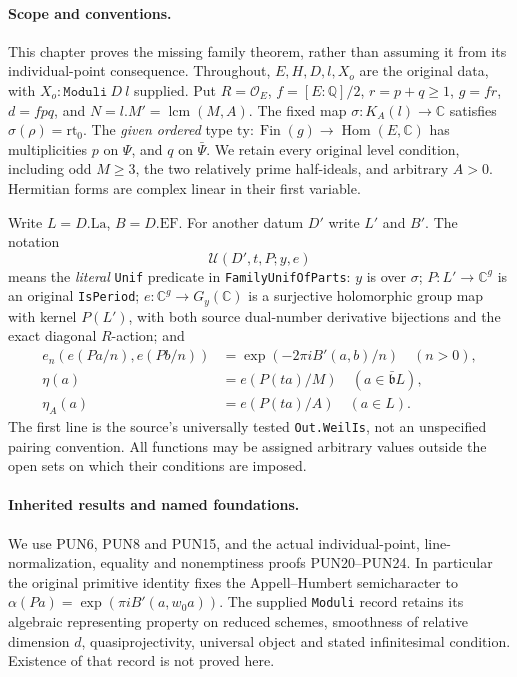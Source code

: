 \documentclass[11pt,a4paper]{article}
\numberwithin{equation}{section}
\theoremstyle{remark}\newtheorem{remark}[theorem]{Remark}
\begin{document}
\paragraph{Scope and conventions.}
This chapter proves the missing family theorem, rather than assuming it
from its individual-point consequence.  Throughout, \(E,H,D,l,X_o\)
are the original data, with \(X_o:\texttt{Moduli}\ D\ l\) supplied.
Put \(R=\mathcal O_E\), \(f=[E:\mathbb Q]/2\), \(r=p+q\geq1\),
\(g=fr\), \(d=fpq\), and \(N=l.M'=\operatorname{lcm}(M,A)\).
The fixed map \(\sigma:K_A(l)\to\mathbb C\) satisfies
\(\sigma(\rho)=\mathrm{rt}_0\).  The \emph{given ordered} type
\(\mathrm{ty}:\operatorname{Fin}(g)\to\operatorname{Hom}(E,\mathbb C)\)
has multiplicities \(p\) on \(\Psi\), and \(q\) on \(\bar\Psi\).
We retain every original level condition, including odd \(M\geq3\),
the two relatively prime half-ideals, and arbitrary \(A>0\).
Hermitian forms are complex linear in their first variable.

Write \(L=D.\mathrm{La}\), \(B=D.\mathrm{EF}\).
For another datum \(D'\) write \(L'\) and \(B'\).
The notation
\[
 \mathcal U(D',t,P;y,e)
 \tag{HUF.1}
\]
means the \emph{literal} \texttt{Unif} predicate in
\texttt{Family\allowbreak Unif\allowbreak Of\allowbreak Parts}: \(y\) is over \(\sigma\);
\(P:L'\to\mathbb C^g\) is an original \texttt{Is\allowbreak Period};
\(e:\mathbb C^g\to G_y(\mathbb C)\) is a surjective holomorphic
group map with kernel \(P(L')\), with both source dual-number
derivative bijections and the exact diagonal \(R\)-action; and
\[
 \begin{split}
 e_n(e(Pa/n),e(Pb/n))&=\exp(-2\pi i B'(a,b)/n)\quad(n>0),\\
 \eta(a)&=e(P(ta)/M)\quad(a\in\bar{\mathfrak b}L),\\
 \eta_A(a)&=e(P(ta)/A)\quad(a\in L).
 \end{split}                                                     \tag{HUF.2}
\]
The first line is the source's universally tested
\texttt{Out.\allowbreak Weil\allowbreak Is}, not an unspecified pairing convention.
All functions may be assigned arbitrary values outside the open sets
on which their conditions are imposed.

\paragraph{Inherited results and named foundations.}
We use PUN6, PUN8 and PUN15, and the actual individual-point,
line-normalization, equality and nonemptiness proofs PUN20--PUN24.
In particular the original primitive identity fixes the
Appell--Humbert semicharacter to
\(\alpha(Pa)=\exp(\pi i B'(a,w_0a))\).
The supplied \texttt{Moduli} record retains its algebraic representing
property on reduced schemes, smoothness of relative dimension \(d\),
quasiprojectivity, universal object and stated infinitesimal condition.
Existence of that record is not proved here.
\end{document}
